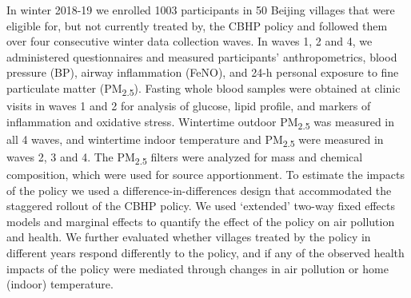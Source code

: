 \documentclass[
  letterpaper,
  DIV=11,
  numbers=noendperiod]{scrartcl}
\providecommand{\DIFadd}[1]{{\protect\color{blue}\uwave{#1}}} %
\providecommand{\DIFaddbegin}{} %
\providecommand{\DIFaddend}{} %
\providecommand{\DIFdelbegin}{} %
\providecommand{\DIFdelend}{} %
\newcommand{\DIFscaledelfig}{0.5}
\newlength{\DIFdelgraphicswidth} %
\newlength{\DIFdelgraphicsheight} %
\newcommand{\DIFaddincludegraphics}[2][]{{\color{blue}\fbox{\DIFOincludegraphics[#1]{#2}}}} %
\newcommand{\DIFdelincludegraphics}[2][]{%
\sbox{\DIFdelgraphicsbox}{\DIFOincludegraphics[#1]{#2}}%
\settoboxwidth{\DIFdelgraphicswidth}{\DIFdelgraphicsbox} %
\settoboxtotalheight{\DIFdelgraphicsheight}{\DIFdelgraphicsbox} %
\scalebox{\DIFscaledelfig}{%
\parbox[b]{\DIFdelgraphicswidth}{\usebox{\DIFdelgraphicsbox}\\[-\baselineskip] \rule{\DIFdelgraphicswidth}{0em}}\llap{\resizebox{\DIFdelgraphicswidth}{\DIFdelgraphicsheight}{%
\setlength{\unitlength}{\DIFdelgraphicswidth}%
\begin{picture}(1,1)%
\thicklines\linethickness{2pt} %
{\color[rgb]{1,0,0}\put(0,0){\framebox(1,1){}}}%
{\color[rgb]{1,0,0}\put(0,0){\line( 1,1){1}}}%
{\color[rgb]{1,0,0}\put(0,1){\line(1,-1){1}}}%
\end{picture}%
}\hspace*{3pt}}} %
} %
\DeclareRobustCommand{\DIFaddbegin}{\DIFOaddbegin \let\includegraphics\DIFaddincludegraphics} %
\DeclareRobustCommand{\DIFaddend}{\DIFOaddend \let\includegraphics\DIFOincludegraphics} %
\DeclareRobustCommand{\DIFdelbegin}{\DIFOdelbegin \let\includegraphics\DIFdelincludegraphics} %
\DeclareRobustCommand{\DIFdelend}{\DIFOaddend \let\includegraphics\DIFOincludegraphics} %
\begin{document}
In winter 2018-19 we enrolled 1003 participants in 50 Beijing villages
that were eligible for, but not currently treated by, the CBHP policy
and followed them over four consecutive winter data collection waves. In
waves 1, 2 and 4, we administered questionnaires and measured
participants' anthropometrics, blood pressure (BP), airway inflammation
(FeNO), and 24-h personal exposure to fine particulate matter
(PM\textsubscript{2.5}). Fasting whole blood samples were obtained at
clinic visits in waves 1 and 2 for analysis of glucose, lipid profile,
and markers of inflammation and oxidative stress. Wintertime outdoor
PM\textsubscript{2.5} was measured in all 4 waves, and wintertime indoor
temperature and PM\textsubscript{2.5} were measured in waves 2, 3 and 4.
The PM\textsubscript{2.5} filters were analyzed for mass and chemical
composition, which were used for source apportionment. To estimate the
impacts of the policy we used a difference-in-differences design that
accommodated the staggered rollout of the CBHP policy. We used
`extended' two-way fixed effects models and marginal effects to quantify
the effect of the policy on air pollution and health. We further
evaluated whether villages treated by the policy in different years
respond differently to the policy, and if any of the observed health
impacts of the policy were mediated through changes in air pollution or
home (indoor) temperature.

\DIFdelbegin %
\DIFdelend \DIFaddbegin \subsubsection*{\DIFadd{Results}}\label{results}
\DIFaddend 
\end{document}
